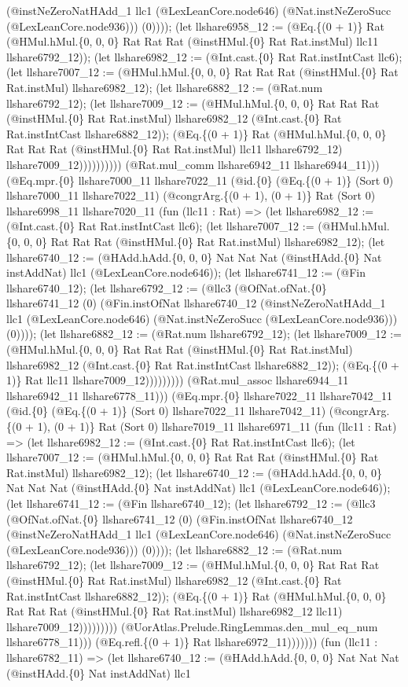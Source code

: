 \documentclass[11pt]{article}
\begin{document}
(@instNeZeroNatHAdd\_1 llc1 (@LexLeanCore.node646) (@Nat.instNeZeroSucc (@LexLeanCore.node936))) (0)))); (let llshare6958\_12 := (@Eq.\{(0 + 1)\} Rat (@HMul.hMul.\{0, 0, 0\} Rat Rat Rat (@instHMul.\{0\} Rat Rat.instMul) llc11 llshare6792\_12)); (let llshare6982\_12 := (@Int.cast.\{0\} Rat Rat.instIntCast llc6); (let llshare7007\_12 := (@HMul.hMul.\{0, 0, 0\} Rat Rat Rat (@instHMul.\{0\} Rat Rat.instMul) llshare6982\_12); (let llshare6882\_12 := (@Rat.num llshare6792\_12); (let llshare7009\_12 := (@HMul.hMul.\{0, 0, 0\} Rat Rat Rat (@instHMul.\{0\} Rat Rat.instMul) llshare6982\_12 (@Int.cast.\{0\} Rat Rat.instIntCast llshare6882\_12)); (@Eq.\{(0 + 1)\} Rat (@HMul.hMul.\{0, 0, 0\} Rat Rat Rat (@instHMul.\{0\} Rat Rat.instMul) llc11 llshare6792\_12) llshare7009\_12)))))))))) (@Rat.mul\_comm llshare6942\_11 llshare6944\_11))) (@Eq.mpr.\{0\} llshare7000\_11 llshare7022\_11 (@id.\{0\} (@Eq.\{(0 + 1)\} (Sort 0) llshare7000\_11 llshare7022\_11) (@congrArg.\{(0 + 1), (0 + 1)\} Rat (Sort 0) llshare6998\_11 llshare7020\_11 (fun (llc11 : Rat) => (let llshare6982\_12 := (@Int.cast.\{0\} Rat Rat.instIntCast llc6); (let llshare7007\_12 := (@HMul.hMul.\{0, 0, 0\} Rat Rat Rat (@instHMul.\{0\} Rat Rat.instMul) llshare6982\_12); (let llshare6740\_12 := (@HAdd.hAdd.\{0, 0, 0\} Nat Nat Nat (@instHAdd.\{0\} Nat instAddNat) llc1 (@LexLeanCore.node646)); (let llshare6741\_12 := (@Fin llshare6740\_12); (let llshare6792\_12 := (@llc3 (@OfNat.ofNat.\{0\} llshare6741\_12 (0) (@Fin.instOfNat llshare6740\_12 (@instNeZeroNatHAdd\_1 llc1 (@LexLeanCore.node646) (@Nat.instNeZeroSucc (@LexLeanCore.node936))) (0)))); (let llshare6882\_12 := (@Rat.num llshare6792\_12); (let llshare7009\_12 := (@HMul.hMul.\{0, 0, 0\} Rat Rat Rat (@instHMul.\{0\} Rat Rat.instMul) llshare6982\_12 (@Int.cast.\{0\} Rat Rat.instIntCast llshare6882\_12)); (@Eq.\{(0 + 1)\} Rat llc11 llshare7009\_12))))))))) (@Rat.mul\_assoc llshare6944\_11 llshare6942\_11 llshare6778\_11))) (@Eq.mpr.\{0\} llshare7022\_11 llshare7042\_11 (@id.\{0\} (@Eq.\{(0 + 1)\} (Sort 0) llshare7022\_11 llshare7042\_11) (@congrArg.\{(0 + 1), (0 + 1)\} Rat (Sort 0) llshare7019\_11 llshare6971\_11 (fun (llc11 : Rat) => (let llshare6982\_12 := (@Int.cast.\{0\} Rat Rat.instIntCast llc6); (let llshare7007\_12 := (@HMul.hMul.\{0, 0, 0\} Rat Rat Rat (@instHMul.\{0\} Rat Rat.instMul) llshare6982\_12); (let llshare6740\_12 := (@HAdd.hAdd.\{0, 0, 0\} Nat Nat Nat (@instHAdd.\{0\} Nat instAddNat) llc1 (@LexLeanCore.node646)); (let llshare6741\_12 := (@Fin llshare6740\_12); (let llshare6792\_12 := (@llc3 (@OfNat.ofNat.\{0\} llshare6741\_12 (0) (@Fin.instOfNat llshare6740\_12 (@instNeZeroNatHAdd\_1 llc1 (@LexLeanCore.node646) (@Nat.instNeZeroSucc (@LexLeanCore.node936))) (0)))); (let llshare6882\_12 := (@Rat.num llshare6792\_12); (let llshare7009\_12 := (@HMul.hMul.\{0, 0, 0\} Rat Rat Rat (@instHMul.\{0\} Rat Rat.instMul) llshare6982\_12 (@Int.cast.\{0\} Rat Rat.instIntCast llshare6882\_12)); (@Eq.\{(0 + 1)\} Rat (@HMul.hMul.\{0, 0, 0\} Rat Rat Rat (@instHMul.\{0\} Rat Rat.instMul) llshare6982\_12 llc11) llshare7009\_12))))))))) (@UorAtlas.Prelude.RingLemmas.den\_mul\_eq\_num llshare6778\_11))) (@Eq.refl.\{(0 + 1)\} Rat llshare6972\_11))))))) (fun (llc11 : llshare6782\_11) => (let llshare6740\_12 := (@HAdd.hAdd.\{0, 0, 0\} Nat Nat Nat (@instHAdd.\{0\} Nat instAddNat) llc1 
\end{document}
